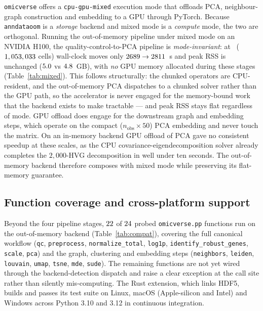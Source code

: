 \documentclass[11pt]{article}
\begin{document}
\texttt{omicverse} offers a \texttt{cpu-gpu-mixed} execution mode that
offloads PCA, neighbour-graph construction and embedding to a GPU through
PyTorch. Because \texttt{anndataoom} is a \emph{storage} backend and mixed
mode is a \emph{compute} mode, the two are orthogonal. Running the
out-of-memory pipeline under mixed mode on an NVIDIA H100, the
quality-control-to-PCA pipeline is \emph{mode-invariant}: at \mixedOomLabel\
($1,053,033$ cells) wall-clock moves only $2689\to2811$~s
and peak RSS is unchanged ($5.0$ vs $4.8$~GB),
with \emph{no} GPU memory allocated during these stages
(Table~\ref{tab:mixed}). This follows structurally: the chunked operators are
CPU-resident, and the out-of-memory PCA dispatches to a chunked solver rather
than the GPU path, so the accelerator is never engaged for the
memory-bound work that the backend exists to make tractable --- and peak RSS
stays flat regardless of mode. GPU offload does engage for the downstream
graph and embedding steps, which operate on the compact
($n_\mathrm{obs}\times 50$) PCA embedding and never touch the matrix. On an
in-memory backend GPU offload of PCA gave no consistent speedup at these
scales, as the CPU covariance-eigendecomposition solver already completes the
$2{,}000$-HVG decomposition in well under ten seconds. The out-of-memory
backend therefore composes with mixed mode while preserving its flat-memory
guarantee.

\begin{table}[t]
  \centering\footnotesize
  \caption{\textbf{CPU vs CPU-GPU-mixed} on the out-of-memory and in-memory
    backends across scale. ``GPU (MB)'' is peak PyTorch device memory during
    the four-stage pipeline; it is $\approx 0$ for the out-of-memory backend
    because its PCA path is CPU-resident.}
  \label{tab:mixed}
  \resizebox{\textwidth}{!}{}
\end{table}

\subsection{Function coverage and cross-platform support}

Beyond the four pipeline stages, $22$ of $24$ probed
\texttt{omicverse.pp} functions run on the out-of-memory backend
(Table~\ref{tab:compat}), covering the full canonical workflow
(\texttt{qc}, \texttt{preprocess}, \texttt{normalize\_total},
\texttt{log1p}, \texttt{identify\_robust\_genes}, \texttt{scale},
\texttt{pca}) and the graph, clustering and embedding steps
(\texttt{neighbors}, \texttt{leiden}, \texttt{louvain}, \texttt{umap},
\texttt{tsne}, \texttt{mde}, \texttt{sude}). The remaining functions are not
yet wired through the backend-detection dispatch and raise a clear exception
at the call site rather than silently mis-computing. The Rust extension,
which links HDF5, builds and passes its test suite on Linux, macOS
(Apple-silicon and Intel) and Windows across Python 3.10 and 3.12 in
continuous integration.
\end{document}
